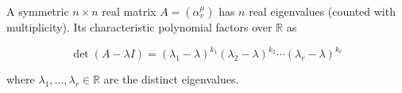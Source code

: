 A symmetric $n \times n$ real matrix $A = (\alpha_v^\mu)$ has $n$ real eigenvalues (counted with multiplicity). Its characteristic polynomial factors over $\mathbb{R}$ as

$$\det(A - \lambda I) = (\lambda_1 - \lambda)^{k_1} (\lambda_2 - \lambda)^{k_2} \cdots (\lambda_r - \lambda)^{k_r}$$

where $\lambda_1, \ldots, \lambda_r \in \mathbb{R}$ are the distinct eigenvalues.
